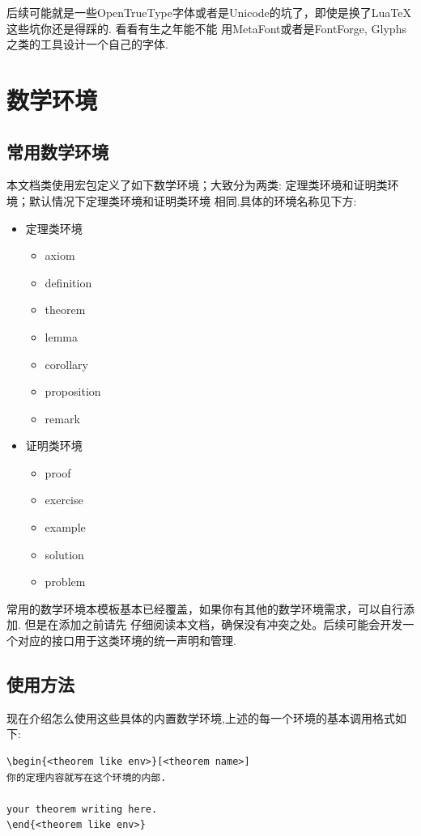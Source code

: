 后续可能就是一些OpenTrueType字体或者是Unicode的坑了，即使是换了Lua\TeX{}这些坑你还是得踩的. 看看有生之年能不能
用MetaFont或者是FontForge, Glyphs之类的工具设计一个自己的字体.

\section{数学环境}
\subsection{常用数学环境}\label{常用数学环境}
本文档类使用宏包定义了如下数学环境；大致分为两类: 定理类环境和证明类环境；默认情况下定理类环境和证明类环境
相同.具体的环境名称见下方:

\begin{multicols}{2}
\begin{itemize}
    \item 定理类环境
        \begin{itemize}
        \item axiom
        \item definition
        \item theorem 
        \item lemma
        \item corollary 
        \item proposition
        \item remark 
        \end{itemize}
    \item 证明类环境
    \begin{itemize}
        \item proof
        \item exercise
        \item example
        \item solution
        \item problem
    \end{itemize}
\end{itemize}    
\end{multicols}

常用的数学环境本模板基本已经覆盖，如果你有其他的数学环境需求，可以自行添加. 但是在添加之前请先
仔细阅读本文档，确保没有冲突之处。后续可能会开发一个对应的接口用于这类环境的统一声明和管理.

\subsection{使用方法}
现在介绍怎么使用这些具体的内置数学环境,上述的每一个环境的基本调用格式如下:
\begin{verbatim}
\begin{<theorem like env>}[<theorem name>]
你的定理内容就写在这个环境的内部.

your theorem writing here. 
\end{<theorem like env>}
\end{verbatim}


